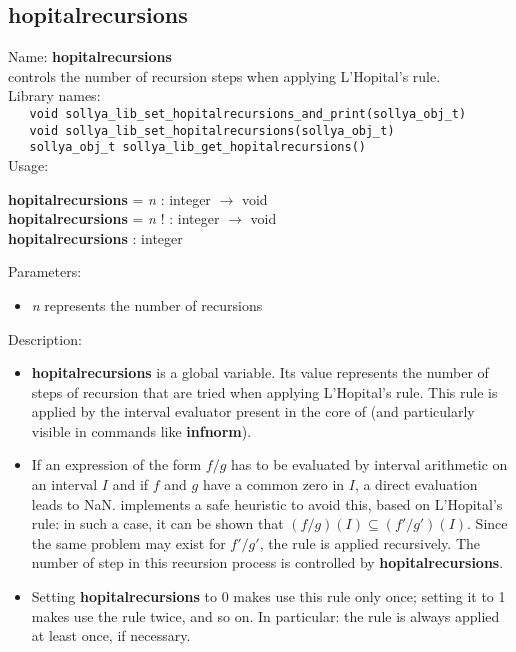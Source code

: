 \subsection{hopitalrecursions}
\label{labhopitalrecursions}
\noindent Name: \textbf{hopitalrecursions}\\
\phantom{aaa}controls the number of recursion steps when applying L'Hopital's rule.\\[0.2cm]
\noindent Library names:\\
\verb|   void sollya_lib_set_hopitalrecursions_and_print(sollya_obj_t)|\\
\verb|   void sollya_lib_set_hopitalrecursions(sollya_obj_t)|\\
\verb|   sollya_obj_t sollya_lib_get_hopitalrecursions()|\\[0.2cm]
\noindent Usage: 
\begin{center}
\textbf{hopitalrecursions} = \emph{n} : \textsf{integer} $\rightarrow$ \textsf{void}\\
\textbf{hopitalrecursions} = \emph{n} ! : \textsf{integer} $\rightarrow$ \textsf{void}\\
\textbf{hopitalrecursions} : \textsf{integer}\\
\end{center}
Parameters: 
\begin{itemize}
\item \emph{n} represents the number of recursions
\end{itemize}
\noindent Description: \begin{itemize}

\item \textbf{hopitalrecursions} is a global variable. Its value represents the number of steps of
   recursion that are tried when applying L'Hopital's rule. This rule is applied
   by the interval evaluator present in the core of \sollya (and particularly
   visible in commands like \textbf{infnorm}).

\item If an expression of the form $f/g$ has to be evaluated by interval 
   arithmetic on an interval $I$ and if $f$ and $g$ have a common zero
   in $I$, a direct evaluation leads to NaN.
   \sollya implements a safe heuristic to avoid this, based on L'Hopital's rule: in 
   such a case, it can be shown that $(f/g)(I) \subseteq (f'/g')(I)$. Since
   the same problem may exist for $f'/g'$, the rule is applied recursively.
   The number of step in this recursion process is controlled by \textbf{hopitalrecursions}.

\item Setting \textbf{hopitalrecursions} to 0 makes \sollya use this rule only once;
   setting it to 1 makes \sollya use the rule twice, and so on.
   In particular: the rule is always applied at least once, if necessary.
\end{itemize}

